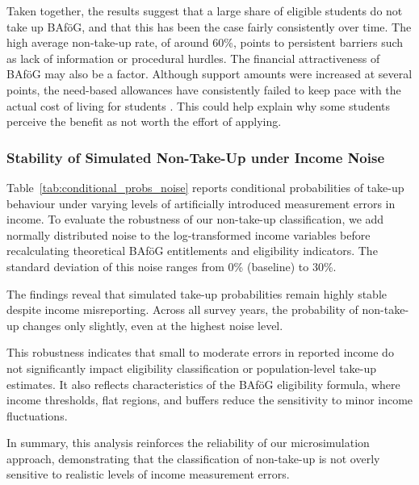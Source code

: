Taken together, the results suggest that a large share of eligible students do not take up BAföG, and that this has been the case fairly consistently over time. 
The high average non-take-up rate, of around 60\%, points to persistent barriers such as lack of information or procedural hurdles. 
The financial attractiveness of BAföG may also be a factor. 
Although support amounts were increased at several points, the need-based allowances have consistently failed to keep pace with the actual cost of living for students \citep{staack_von_2017}. 
This could help explain why some students perceive the benefit as not worth the effort of applying. 


\subsubsection{Stability of Simulated Non-Take-Up under Income Noise}
Table~\ref{tab:conditional_probs_noise} reports conditional probabilities of take-up behaviour under varying levels of artificially introduced measurement errors in income. 
To evaluate the robustness of our non-take-up classification, we add normally distributed noise to the log-transformed income variables before recalculating theoretical BAföG entitlements and eligibility indicators. 
The standard deviation of this noise ranges from 0\% (baseline) to 30\%.



The findings reveal that simulated take-up probabilities remain highly stable despite income misreporting. 
Across all survey years, the probability of non-take-up changes only slightly, even at the highest noise level. 

This robustness indicates that small to moderate errors in reported income do not significantly impact eligibility classification or population-level take-up estimates. 
It also reflects characteristics of the BAföG eligibility formula, where income thresholds, flat regions, and buffers reduce the sensitivity to minor income fluctuations.

In summary, this analysis reinforces the reliability of our microsimulation approach, demonstrating that the classification of non-take-up is not overly sensitive to realistic levels of income measurement errors.



